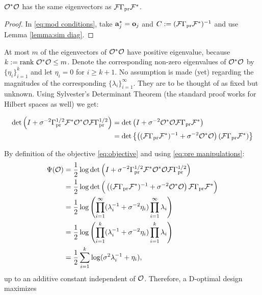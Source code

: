 \documentclass{amsart}
\numberwithin{equation}{section}
\begin{document}
\begin{corollary}\label{cor:same ev}
  $\mathcal{O}^*\mathcal{O}$ has the same eigenvectors as $\mathcal{F} \Gamma_{\textup{pr}} \mathcal{F}^*$.
\end{corollary}
\begin{proof}
In \eqref{eq:mod conditions}, take $\mathbf{a}_j^{*} = \mathbf{o}_j$ and $C :=
(\mathcal{F} \Gamma_{\textup{pr}} \mathcal{F}^*)^{-1}$ and use Lemma \ref{lemma:sim diag}.
\end{proof}
At most $m$ of the eigenvectors of $\mathcal{O}^*\mathcal{O}$ have positive
eigenvalue, because $k := \textup{rank}\  \mathcal{O}^*\mathcal{O} \leq m$. Denote the
corresponding non-zero eigenvalues of $\mathcal{O}^*\mathcal{O}$ by
$\{\eta_i\}_{i=1}^{k}$ and let $\eta_i = 0$ for $i \geq k+1$. No
assumption is made (yet) regarding the magnitudes of the corresponding
$\{\lambda_i\}_{i=1}^{\infty}$. They are to be thought of as fixed but
unknown. Using Sylvester's Determinant Theorem (the standard proof
works for Hilbert spaces as well) we get:

\begin{align}\label{eq:pre manipulations}
  \begin{split}
    \det \left (I + \sigma^{-2} \Gamma_{\textup{pr}}^{1/2} \mathcal{F} ^* \mathcal{O}^*
    \mathcal{O} \mathcal{F} \Gamma_{\textup{pr}}^{1/2}\right ) &=
    \det \left (I + \sigma^{-2} \mathcal{O}^*
    \mathcal{O} \mathcal{F} \Gamma_{\textup{pr}}\mathcal{F}^* \right ) \\
    &= \det \left \{ \left ( (\mathcal{F} \Gamma_{\textup{pr}} \mathcal{F}^*)^{-1} +
    \sigma^{-2}\mathcal{O}^*\mathcal{O} \right ) (\mathcal{F} \Gamma_{\textup{pr}} \mathcal{F}^*)\right \}\\
  \end{split}
\end{align}


By definition of the objective \eqref{eq:objective} and using
\eqref{eq:pre manipulations}:
\begin{align}\label{eq:mod objective}
  \begin{split}
    \Psi ( \mathcal{O} ) &=\frac12 \log \det \left( I + \sigma^{-2}
    \Gamma_{\textup{pr}}^{1/2} \mathcal{F} ^* \mathcal{O}^* \mathcal{O} \mathcal{F} \Gamma_{\textup{pr}}^{1/2} \right )\\
    &=\frac12 \log \det \Big ( \left ( (\mathcal{F} \Gamma_{\textup{pr}} \mathcal{F}^* )^{-1} +
    \sigma^{-2}\mathcal{O}^* \mathcal{O} \right ) \mathcal{F} \Gamma_{\textup{pr}} \mathcal{F}^* \Big )\\
    &=\frac12 \log \left (\prod_{i=1}^{\infty} ( \lambda_i^{-1} + \sigma^{-2} \eta_i ) \prod_{i=1}^{\infty} \lambda_i \right ) \\
    &=\frac12 \log \left ( \prod_{i=1}^{k} ( \lambda_i^{-1} + \sigma^{-2} \eta_i )\prod_{i=1}^{k} \lambda_i \right )\\
    &=\frac12 \sum_{i=1}^{k} \log (\sigma^2\lambda_i^{-1} + \eta_i), 
  \end{split}
\end{align}
up to an additive constant independent of $\mathcal{O}$. Therefore, a
D-optimal design maximizes
\end{document}
